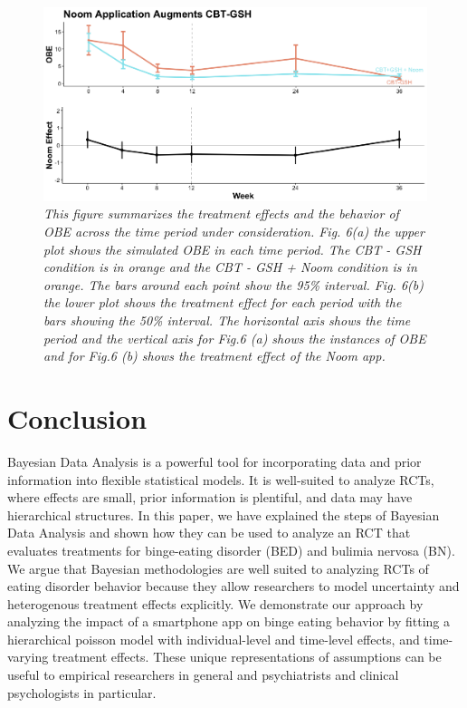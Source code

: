 \documentclass{article}
\begin{document}
\begin{figure}[H]
\begin{center}
\includegraphics[width=\textwidth, height=\textheight, keepaspectratio]{noom_effect.png}
\caption{\emph{This figure summarizes the treatment effects and the behavior of OBE across the time period under consideration. Fig. 6(a) the upper plot shows the simulated OBE in each time period. The CBT - GSH condition is in orange and the CBT - GSH + Noom condition is in orange. The bars around each point show the 95\% interval. Fig. 6(b) the lower plot shows the treatment effect for each period with the bars showing the 50\% interval. The horizontal axis shows the time period and the vertical axis for Fig.6 (a) shows the instances of OBE and for Fig.6 (b) shows the treatment effect of the Noom app.}}
\end{center}
\end{figure}


\section{Conclusion}
Bayesian Data Analysis is a powerful tool for incorporating data and prior information into flexible statistical models.  It is well-suited to analyze RCTs, where effects are small, prior information is plentiful, and data may have hierarchical structures.  In this paper, we have explained the steps of Bayesian Data Analysis and shown how they can be used to analyze an RCT that evaluates treatments for binge-eating disorder (BED) and bulimia nervosa (BN).  We argue that Bayesian methodologies are well suited to analyzing RCTs of eating disorder behavior because they allow researchers to model uncertainty and heterogenous treatment effects explicitly. We demonstrate our approach by analyzing the impact of a smartphone app on binge eating behavior by fitting a hierarchical poisson model with individual-level and time-level effects, and time-varying treatment effects.  These unique representations of assumptions can be useful to empirical researchers in general and psychiatrists and clinical psychologists in particular.
\newpage
\end{document}
